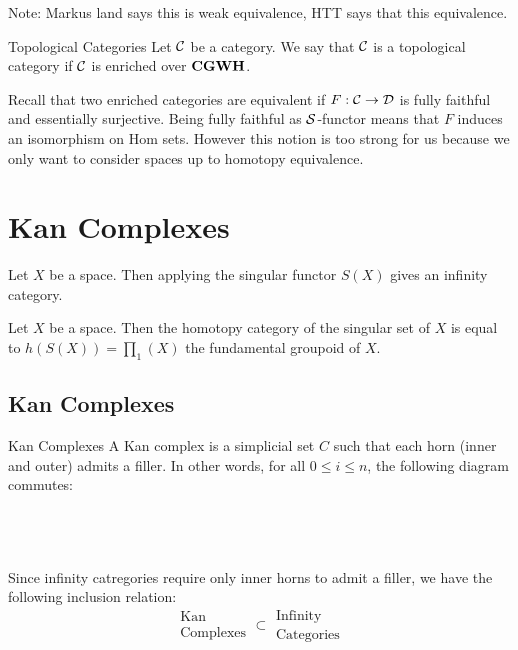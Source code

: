 \documentclass[a4paper]{article}
\begin{document}
Note: Markus land says this is weak equivalence, HTT says that this equivalence. 

\begin{defn}{Topological Categories}{} Let $\mathcal{C}$ be a category. We say that $\mathcal{C}$ is a topological category if $\mathcal{C}$ is enriched over $\bold{CGWH}$. 
\end{defn}

Recall that two enriched categories are equivalent if $F:\mathcal{C}\to\mathcal{D}$ is fully faithful and essentially surjective. Being fully faithful as $\mathcal{S}$-functor means that $F$ induces an isomorphism on Hom sets. However this notion is too strong for us because we only want to consider spaces up to homotopy equivalence. 


\pagebreak
\section{Kan Complexes}
\begin{lmm}{}{} Let $X$ be a space. Then applying the singular functor $S(X)$ gives an infinity category. 
\end{lmm}

\begin{prp}{}{} Let $X$ be a space. Then the homotopy category of the singular set of $X$ is equal to $h(S(X))=\prod_1(X)$ the fundamental groupoid of $X$. 
\end{prp}

\subsection{Kan Complexes}
\begin{defn}{Kan Complexes}{} A Kan complex is a simplicial set $C$ such that each horn (inner and outer) admits a filler. In other words, for all $0\leq i\leq n$, the following diagram commutes: \\~\\
\\~\\
\end{defn}

Since infinity catregories require only inner horns to admit a filler, we have the following inclusion relation: $$\substack{\text{Kan}\\\text{Complexes}}\subset\substack{\text{Infinity}\\\text{Categories}}$$
\end{document}
